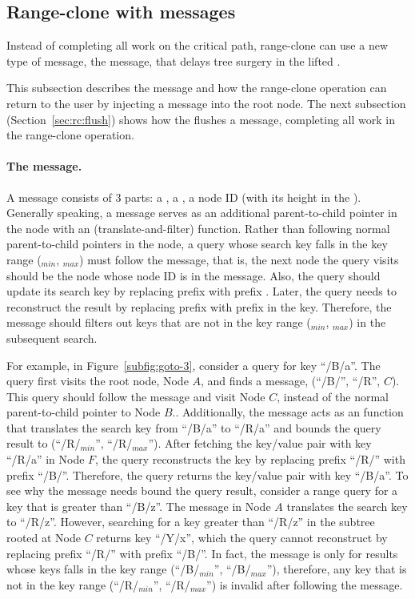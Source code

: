 \subsection{Range-clone with \goto messages}
\label{sec:rc:goto}

Instead of completing all work on the critical path, range-clone can use a
new type of message, the \goto message, that delays tree surgery
in the lifted \bedag.

This subsection describes the \goto message and how the range-clone operation
can return to the user by injecting a \goto message into the root node.
The next subsection (Section~\ref{sec:rc:flush}) shows how the \bet flushes
a \goto message,
completing all work in the range-clone operation.

\paragraph{The \goto message.}
A \goto message consists of 3 parts: a \dpre, a \spre, a node ID
(with its height in the \bedag).
Generally speaking, a \goto message serves as an additional parent-to-child
pointer in the \bet node with an \xf (translate-and-filter) function.
Rather than following normal parent-to-child pointers in the node,
a query whose search key falls in the key range (\dpre$_{min}$, \dpre$_{max}$)
must follow the \goto message, that is, the next node the query visits
should be the node whose node ID is in the \goto message.
Also, the query should update its search key by replacing prefix \dpre with
prefix \spre.
Later, the query needs to reconstruct the result by replacing prefix \spre
with prefix \dpre in the key.
Therefore, the \goto message should filters out keys that are not in the
key range (\spre$_{min}$, \spre$_{max}$) in the subsequent search.

For example, in Figure~\ref{subfig:goto-3}, consider a query for key ``/B/a''.
The query first visits the root node, Node $A$, and finds a \goto message,
\goto(``/B/'', ``/R'', $C$).
This query should follow the \goto message and visit Node $C$,
instead of the normal parent-to-child pointer to Node $B$..
Additionally, the \goto message acts as an \xf function that translates the
search key from ``/B/a'' to ``/R/a'' and bounds the query result to
(``/R/$_{min}$'', ``/R/$_{max}$'').
After fetching the key/value pair with key ``/R/a'' in Node $F$,
the query reconstructs the key by replacing prefix ``/R/'' with prefix ``/B/''.
Therefore, the query returns the key/value pair with key ``/B/a''.
To see why the \goto message needs bound the query result,
consider a range query for a key that is greater than ``/B/z''.
The \goto message in Node $A$ translates the search key to ``/R/z''.
However, searching for a key greater than ``/R/z'' in the subtree rooted at
Node $C$ returns key ``/Y/x'',
which the query cannot reconstruct by replacing prefix ``/R/'' with prefix
``/B/''.
In fact, the \goto message is only for results whose keys falls in the key
range (``/B/$_{min}$'', ``/B/$_{max}$''),
therefore, any key that is not in the key range
(``/R/$_{min}$'', ``/R/$_{max}$'') is invalid after following the \goto message.

